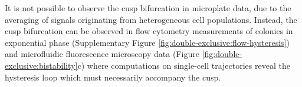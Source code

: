 It is not possible to observe the cusp bifurcation in microplate data, due to the averaging of signals originating from heterogeneous cell populations. Instead, the cusp bifurcation can be observed in flow cytometry measurements of colonies in exponential phase (Supplementary Figure \ref{fig:double-exclusive:flow-hysteresis}) and microfluidic fluorescence microscopy data (Figure \ref{fig:double-exclusive:bistability}c) where computations on single-cell trajectories reveal the hysteresis loop which must necessarily accompany the cusp. 